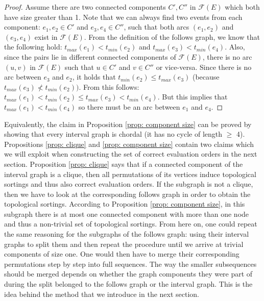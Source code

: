 \begin{proof}
Assume there are two connected components $C', C''$ in $\mathcal{F}(E)$ which both have size greater than 1.
Note that we can always find two events from each component: $e_1, e_2 \in C'$ and $e_3, e_4 \in C''$,
such that both arcs $(e_1,e_2)$ and $(e_3,e_4)$ exist in $\mathcal{F}(E)$.
From the definition of the follows graph, we know that the following hold: 
$t_{max}(e_1) < t_{min}(e_2)$ and $t_{max}(e_3) < t_{min}(e_4)$.
Also, since the pairs lie in different connected components of $\mathcal{F}(E)$, there is no arc $(u,v)$ in $\mathcal{F}(E)$ such that $u \in C'$ and $v \in C''$ or vice-versa.
Since there is no arc between $e_3$ and $e_2$, it holds that $t_{min}(e_2) \leq t_{max}(e_3)$ (because $t_{max}(e_3) \not < t_{min}(e_2))$. 
From this follows:
$t_{max}(e_1) < t_{min}(e_2) \leq t_{max}(e_3) < t_{min}(e_4)$.
But this implies that $t_{max}(e_1) < t_{min}(e_4)$ so there must be an arc between $e_1$ and $e_4$.
\end{proof}
Equivalently, the claim in Proposition \ref{prop: component size} can be proved by showing that every interval graph is chordal (it has no cycle of length $\geq$ 4).
Propositions \ref{prop: clique} and \ref{prop: component size} contain two claims which we will exploit when constructing the set of correct evaluation orders in the next section.
Proposition \ref{prop: clique} says that if a connected component of the interval graph is a clique, then all permutations of its vertices induce topological sortings and thus also correct evaluation orders.
If the subgraph is not a clique, then we have to look at the corresponding follows graph in order to obtain the topological sortings.
According to Proposition \ref{prop: component size}, in this subgraph there is at most one connected component with more than one node and thus a non-trivial set of topological sortings. 
From here on, one could repeat the same reasoning for the subgraphs of the follows graph: using their interval graphs to split  them and then repeat the procedure until we arrive at trivial components of size one.
One would then have to merge their corresponding permutations step by step into full sequences.
The way the smaller subsequences should be merged depends on whether the graph components they were part of during the split belonged to the follows graph or the interval graph.
This is the idea behind the method that we introduce in the next section.
%
%
%
%
